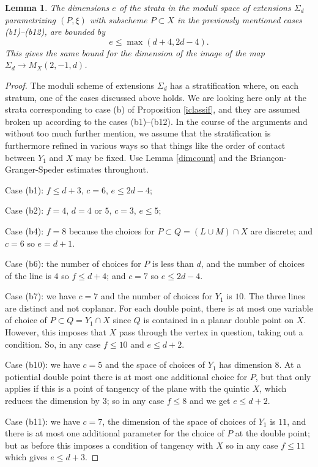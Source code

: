 \documentclass{amsart}
\theoremstyle{plain}
\newtheorem{lemma}[theorem]{Lemma}
\numberwithin{equation}{section}
\begin{document}
\begin{lemma}
\label{inYdims}
The dimensions $e$ of the strata in the moduli space of extensions $\Sigma _d$
parametrizing $(P,\xi )$ with subscheme 
$P\subset X$ in the previously mentioned cases (b1)--(b12), are bounded by
$$
e\leq \max (d+4, 2d-4).
$$
This gives the same bound for the dimension of the image of the map 
$\Sigma _d\rightarrow M_X(2,-1,d)$.
\end{lemma}
\begin{proof}
The moduli scheme of extensions $\Sigma _d$ has a stratification where, on each stratum,
one of the cases discussed above holds. We are looking here only at the strata 
corresponding to case (b) of Proposition \ref{iclassif}, and they are assumed 
broken up according
to the cases (b1)--(b12). In the course of the arguments and without too much further mention,
we assume that the stratification is furthermore refined in various ways so that things like
the order of contact between $Y_1$ and $X$ may be fixed. 
Use Lemma \ref{dimcount} and the Brian\c{c}on-Granger-Speder estimates \cite{BGS} throughout.

Case (b1): $f\leq d+3$, $c=6$, $e\leq 2d-4$;

Case (b2): $f=4$, $d=4$ or $5$, $c=3$, $e\leq 5$;

Case (b4): $f=8$ because the choices for $P\subset Q=(L\cup M)\cap X$
are discrete; and $c=6$ so $e= d+1$.  

Case (b6): the number of choices for $P$ is less than $d$, and the number
of choices of the line is $4$ so $f\leq d+4$; and $c=7$ so 
$e\leq 2d - 4$. 

Case (b7): we have $c=7$ and the number of choices for $Y_1$ is
$10$. The three lines are distinct and not coplanar. 
For each double point, there is at most one variable
of choice of $P\subset Q=Y_1\cap X$ since $Q$ is contained in a planar double point on 
$X$. However, this imposes that $X$ pass through the vertex
in question, taking out a condition. So, in any case $f\leq 10$ and $e\leq d+2$. 

Case (b10): we have $c=5$ and the space of choices of $Y_1$ has dimension $8$.
At a potiential double point there is at most one additional choice for $P$, 
but that only applies if this is a point of tangency of the plane with
the quintic $X$, which reduces the dimension by $3$; so in any case
$f\leq 8$ and we get $e\leq d+2$. 

Case (b11): we have $c=7$, the dimension of the space of choices of $Y_1$ is
$11$, and there is at most one additional parameter for the choice of $P$
at the double point; but as before this imposes a condition
of tangency with $X$ so in any case $f\leq 11$ which gives $e\leq d+3$. 


\end{proof}
\end{document}
